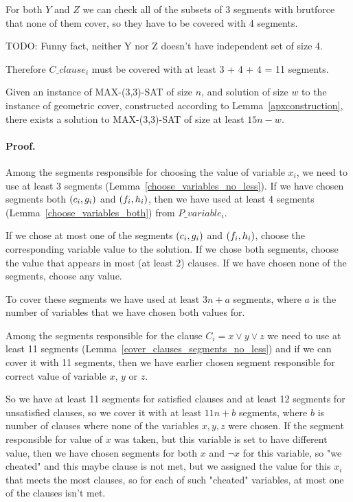 For both $Y$ and $Z$ we can check all of the subsets of 3 segments
with brutforce that none of them cover, so they have to be covered with
4 segments.

TODO: Funny fact, neither Y nor Z doesn't have independent set of size 4.

Therefore $C\_clause_i$ must be covered with at least 3 + 4 + 4 = 11 segments.

\begin{lemma}
	\label{construction_completness}
	Given an instance of MAX-(3,3)-SAT of size $n$,
	and solution of size $w$ to the instance of geometric cover,
	constructed	according to Lemma~\ref{apxconstruction},  
	there exists a solution to MAX-(3,3)-SAT of size at least $15n - w$.
\end{lemma}
\paragraph{Proof.}
Among the segments responsible for choosing the value of variable $x_i$,
we need to use at least 3 segments (Lemma~\ref{choose_variables_no_less}).
If we have chosen segments both $(c_i, g_i)$ and $(f_i, h_i)$,
then we have used at least 4 segments (Lemma~\ref{choose_variables_both})
from $P\_variable_i$.

If we chose at most one of the segments $(c_i, g_i)$ and $(f_i, h_i)$,
choose the corresponding variable value to the solution.
If we chose both segments,
choose the value that appears in most (at least 2) clauses.
If we have chosen none of the segments, choose any value.

To cover these segments we have used at least $3n + a$ segments,
where $a$ is the number of variables that we have chosen both
values for.

Among the segments responsible for the clause $C_i = x \lor y \lor z$
we need to use at least 11 segments
(Lemma~\ref{cover_clauses_segments_no_less})
and if we can cover it with 11 segments, then we have 
earlier chosen
segment responsible for correct value of variable $x$, $y$ or $z$.

So we have at least 11 segments for satisfied clauses
and at least 12 segments
for unsatisfied clauses, so we cover it with 
at least $11n + b$ segments, where $b$ is number of clauses
where none of the variables $x, y, z$ were chosen.
If the segment responsible for value of $x$ was taken,
but this variable is set to have different value,
then we have chosen segments for both $x$ and $\neg x$ for this variable,
so "we cheated" and this maybe clause is not met,
but we assigned the value for this $x_i$ that meets
the most clauses, so for each of such "cheated" variables,
at most one of the clauses isn't met.

